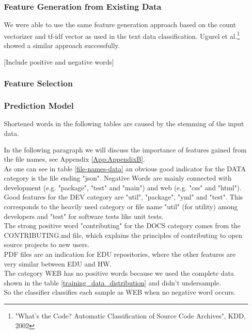 \documentclass[%
a4paper,
DIV12,
2.5headlines,
bigheadings,
titlepage,
openbib,
]{scrartcl}
\begin{document}
\subsubsection{Feature Generation from Existing
Data}\label{feature-generation-from-existing-data-1}

We were able to use the same feature generation approach based on the count vectorizer and tf-idf vector as used in the text data classification.
Ugurel et al.\footnote{"What's the Code? Automatic Classification of Source Code Archives", KDD, 2002} showed a similar approach successfully.

[Include positive and negative words]

\subsubsection{Feature Selection}\label{feature-selection-2}


\subsubsection{Prediction Model}\label{prediction-model-2}

Shortened words in the following tables are caused by the stemming of the input data.\\


In the following paragraph we will discuss the importance of features gained from the file names, see Appendix \ref{App:AppendixB}. \\
As one can see in table \ref{file-names-data} an obvious good indicator for the DATA category is the file ending "json".
Negative Words are mainly connected with development (e.g. "package", "test" and "main") and web (e.g. "css" and "html").\\
Good features for the DEV category are "util", "package", "yml" and "test".
This corresponds to the heavily used category or file name "util" (for utility) among developers and "test" for software tests like unit tests. \\
The strong positive word "contributing" for the DOCS category comes from the CONTRIBUTING.md file, which explains the principles of contributing to open source projects to new users.\\
PDF files are an indication for EDU repositories, where the other features are very similar between EDU and HW.\\
The category WEB has no positive words because we used the complete data shown in the table \ref{training_data_distribution} and didn't undersample.\\
So the classifier classifies each sample as WEB when no negative word occurs.\\
\end{document}
